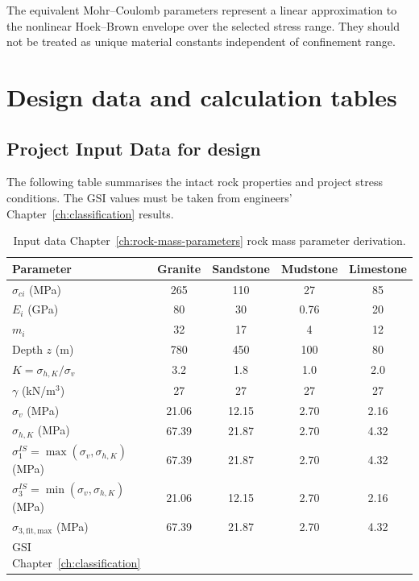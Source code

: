 \begin{keybox}[Interpretation]
The equivalent Mohr--Coulomb parameters represent a linear approximation to the nonlinear
Hoek--Brown envelope over the selected stress range. They should not be treated as
unique material constants independent of confinement range.
\end{keybox}

\section{Design data and calculation tables}
\label{sec:ch4-design-data}

\subsection{Project Input Data for design}

The following table summarises the intact rock properties and project stress conditions.
The GSI values must be taken from engineers' Chapter~\ref{ch:classification} results.

\begin{table}[H]
\centering
\scriptsize
\begin{tabularx}{\textwidth}{l c c c c}
\toprule
\textbf{Parameter} & \textbf{Granite} & \textbf{Sandstone} & \textbf{Mudstone} & \textbf{Limestone} \\
\midrule
\(\sigma_{ci}\) (MPa) & 265 & 110 & 27 & 85 \\
\(E_i\) (GPa) & 80 & 30 & 0.76 & 20 \\
\(m_i\) & 32 & 17 & 4 & 12 \\
Depth \(z\) (m) & 780 & 450 & 100 & 80 \\
\(K=\sigma_{h,K}/\sigma_v\) & 3.2 & 1.8 & 1.0 & 2.0 \\
\(\gamma\) (kN/m\(^3\)) & 27 & 27 & 27 & 27 \\
\midrule
\(\sigma_v\) (MPa) & 21.06 & 12.15 & 2.70 & 2.16 \\
\(\sigma_{h,K}\) (MPa) & 67.39 & 21.87 & 2.70 & 4.32 \\
\(\sigma_1^{IS}=\max(\sigma_v,\sigma_{h,K})\) (MPa) & 67.39 & 21.87 & 2.70 & 4.32 \\
\(\sigma_3^{IS}=\min(\sigma_v,\sigma_{h,K})\) (MPa) & 21.06 & 12.15 & 2.70 & 2.16 \\
\(\sigma_{3,\mathrm{fit,max}}\) (MPa) & 67.39 & 21.87 & 2.70 & 4.32 \\
\midrule
GSI Chapter~\ref{ch:classification} & \underline{\hspace{1.5cm}} & \underline{\hspace{1.5cm}} & \underline{\hspace{1.5cm}} & \underline{\hspace{1.5cm}} \\
\bottomrule
\end{tabularx}
\caption{Input data Chapter~\ref{ch:rock-mass-parameters} rock mass parameter derivation.}
\label{tab:inputdata}
\end{table}

